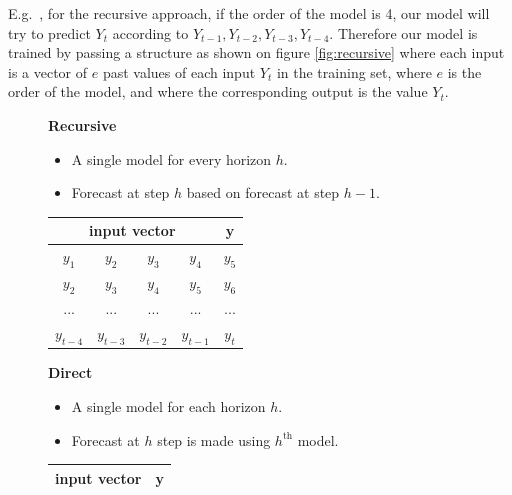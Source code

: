 \documentclass[11pt,a4paper,oneside]{book}
\begin{document}
E.g.\ , for the recursive approach, if the order of the model is 4, our model will try to predict $Y_t$ according to  $Y_{t-1}, Y_{t-2}, Y_{t-3}, Y_{t-4}$. Therefore our model is trained by passing a structure as shown on figure \ref{fig:recursive} where each input is a vector of $e$ past values of each input $Y_t$ in the training set, where $e$ is the order of the model, and where the corresponding output is the value $Y_t$. 
 

\begin{figure}[!h]
\centering
\begin{minipage}{\textwidth}
\begin{minipage}{0.5\textwidth}
\begin{center}
\textbf{Recursive}
\begin{itemize}
\item A single model for every horizon $h$.
\item Forecast at step $h$ based on forecast at step $h-1$.
\end{itemize}
\vskip10pt
   \begin{footnotesize}
   \begin{tabular}{|cccc|c|}
   \hline
   \multicolumn{4}{|c|}{\textbf{input vector}} & \textbf{y} \\ \hline
   $y_{1}$ & $y_{2}$ & $y_{3}$ & $y_{4}$ & $y_{5}$\\ \hline
   $y_{2}$ & $y_{3}$ & $y_{4}$ & $y_{5}$ & $y_{6}$\\ \hline
   $...$ & $...$ & $...$ & $...$ & $...$\\ \hline
   $y_{t-4}$ & $y_{t-3}$ & $y_{t-2}$ & $y_{t-1}$ & $y_{t}$ \\ \hline
   \end{tabular}
   \end{footnotesize}
\end{center}
\end{minipage}
\begin{minipage}{0.5\textwidth}
\begin{center}
\textbf{Direct}
\begin{itemize}
\item A single model for each horizon $h$.
\item Forecast at $h$ step is made using $h^{\text{th}}$ model.
\end{itemize}
\vskip12pt
   \begin{footnotesize}
   \begin{tabular}{|cccc|c|}
   \hline
   \multicolumn{4}{|c|}{\textbf{input vector}} & \textbf{y} \\ \hline

\end{tabular}
\end{footnotesize}
\end{center}
\end{minipage}
\end{minipage}
\end{figure}
\end{document}
